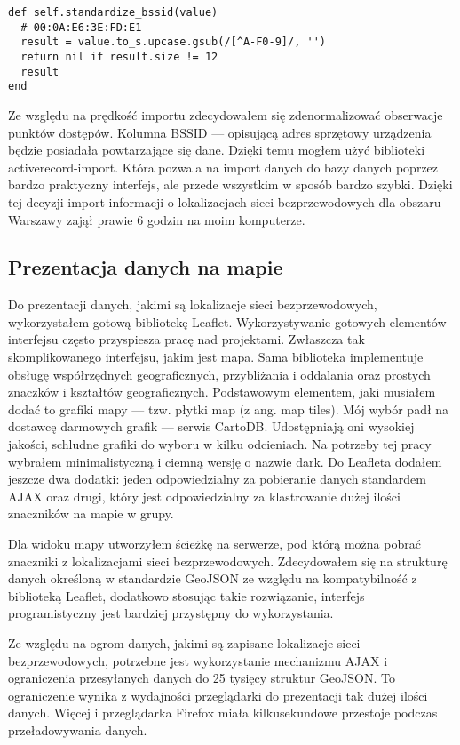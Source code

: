 \begin{verbatim}
def self.standardize_bssid(value)
  # 00:0A:E6:3E:FD:E1
  result = value.to_s.upcase.gsub(/[^A-F0-9]/, '')
  return nil if result.size != 12
  result
end
\end{verbatim}

Ze względu na prędkość importu zdecydowałem się zdenormalizować obserwacje punktów dostępów. Kolumna BSSID — opisującą adres sprzętowy urządzenia będzie posiadała powtarzające się dane. Dzięki temu mogłem użyć biblioteki activerecord-import. Która pozwala na import danych do bazy danych poprzez bardzo praktyczny interfejs, ale przede wszystkim w sposób bardzo szybki. Dzięki tej decyzji import informacji o lokalizacjach sieci bezprzewodowych dla obszaru Warszawy zajął prawie 6 godzin na moim komputerze.

\subsection{Prezentacja danych na mapie}
Do prezentacji danych, jakimi są lokalizacje sieci bezprzewodowych, wykorzystałem gotową bibliotekę Leaflet. Wykorzystywanie gotowych elementów interfejsu często przyspiesza pracę nad projektami. Zwłaszcza tak skomplikowanego interfejsu, jakim jest mapa. Sama biblioteka implementuje obsługę współrzędnych geograficznych, przybliżania i oddalania oraz prostych znaczków i kształtów geograficznych. Podstawowym elementem, jaki musiałem dodać to grafiki mapy — tzw. płytki map (z ang. map tiles). Mój wybór padł na dostawcę darmowych grafik — serwis CartoDB. Udostępniają oni wysokiej jakości, schludne grafiki do wyboru w kilku odcieniach. Na potrzeby tej pracy wybrałem minimalistyczną i ciemną wersję o nazwie dark. Do Leafleta dodałem jeszcze dwa dodatki: jeden odpowiedzialny za pobieranie danych standardem AJAX oraz drugi, który jest odpowiedzialny za klastrowanie dużej ilości znaczników na mapie w grupy.

Dla widoku mapy utworzyłem ścieżkę na serwerze, pod którą można pobrać znaczniki z lokalizacjami sieci bezprzewodowych. Zdecydowałem się na strukturę danych określoną w standardzie GeoJSON ze względu na kompatybilność z biblioteką Leaflet, dodatkowo stosując takie rozwiązanie, interfejs programistyczny jest bardziej przystępny do wykorzystania.

Ze względu na ogrom danych, jakimi są zapisane lokalizacje sieci bezprzewodowych, potrzebne jest wykorzystanie mechanizmu AJAX i ograniczenia przesyłanych danych do 25 tysięcy struktur GeoJSON. To ograniczenie wynika z wydajności przeglądarki do prezentacji tak dużej ilości danych. Więcej i przeglądarka Firefox miała kilkusekundowe przestoje podczas przeładowywania danych.

